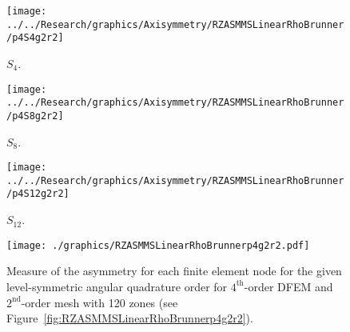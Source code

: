 \documentclass[12pt,letterpaper]{article}
\begin{document}
\begin{sidewaysfigure}[!htb]
\centering
\begin{subfigure}{0.33\textwidth}
\texttt{[image: ../../Research/graphics/Axisymmetry/RZASMMSLinearRhoBrunner/p4S4g2r2]}
\caption{$S_4$.}
\end{subfigure}%
\begin{subfigure}{0.33\textwidth}
\texttt{[image: ../../Research/graphics/Axisymmetry/RZASMMSLinearRhoBrunner/p4S8g2r2]}
\caption{$S_8$.}
\end{subfigure}%
\begin{subfigure}{0.33\textwidth}
\texttt{[image: ../../Research/graphics/Axisymmetry/RZASMMSLinearRhoBrunner/p4S12g2r2]}
\caption{$S_{12}$.}
\end{subfigure}
\caption{Relative asymmetry for $4^\text{th}$-order finite elements on a $2^\text{nd}$-order mesh for given order of level-symmetric angular quadrature.}
\label{fig:RZASMMSLinearRhoBrunnerp4g2r2}
\end{sidewaysfigure}

\begin{figure}[!htb]
\centering
\texttt{[image: ./graphics/RZASMMSLinearRhoBrunnerp4g2r2.pdf]}
\caption{Measure of the asymmetry for each finite element node for the given level-symmetric angular quadrature order for $4^\text{th}$-order DFEM and $2^\text{nd}$-order mesh with 120 zones (see Figure~\ref{fig:RZASMMSLinearRhoBrunnerp4g2r2}).}
\label{fig:RZASMMSLinearRhoBrunnerp4g2r2Nodes}
\end{figure}
\end{document}
